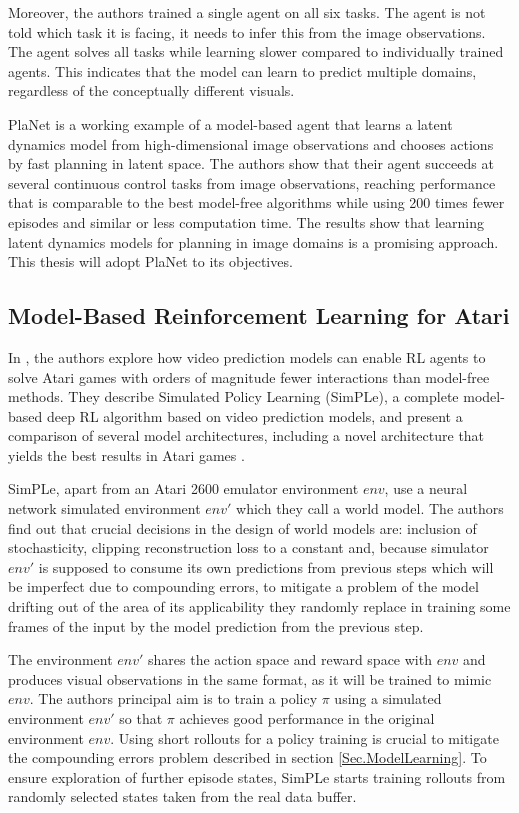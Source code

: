 Moreover, the authors trained a single agent on all six tasks. The agent is not told which task it is facing, it needs to infer this from the image observations. The agent solves all tasks while learning slower compared to individually trained agents. This indicates that the model can learn to predict multiple domains, regardless of the conceptually different visuals.

PlaNet is a working example of a model-based agent that learns a latent dynamics model from high-dimensional image observations and chooses actions by fast planning in latent space. The authors show that their agent succeeds at several continuous control tasks from image observations, reaching performance that is comparable to the best model-free algorithms while using 200 times fewer episodes and similar or less computation time. The results show that learning latent dynamics models for planning in image domains is a promising approach. This thesis will adopt PlaNet to its objectives.

\subsection{Model-Based Reinforcement Learning for Atari}

In \cite{Algo.SimPLe}, the authors explore how video prediction models can enable RL agents to solve Atari games with orders of magnitude fewer interactions than model-free methods. They describe Simulated Policy Learning (SimPLe), a complete model-based deep RL algorithm based on video prediction models, and present a comparison of several model architectures, including a novel architecture that yields the best results in Atari games \cite{Code.ALE}.

SimPLe, apart from an Atari 2600 emulator environment $env$, use a neural network simulated environment $env'$ which they call a world model. The authors find out that crucial decisions in the design of world models are: inclusion of stochasticity, clipping reconstruction loss to a constant and, because simulator $env'$ is supposed to consume its own predictions from previous steps which will be imperfect due to compounding errors, to mitigate a problem of the model drifting out of the area of its applicability they randomly replace in training some frames of the input by the model prediction from the previous step. 

The environment $env'$ shares the action space and reward space with $env$ and produces visual observations in the same format, as it will be trained to mimic $env$. The authors principal aim is to train a policy $\pi$ using a simulated environment $env'$ so that $\pi$ achieves good performance in the original environment $env$. Using short rollouts for a policy training is crucial to mitigate the compounding errors problem described in section \ref{Sec.ModelLearning}. To ensure exploration of further episode states, SimPLe starts training rollouts from randomly selected states taken from the real data buffer.

